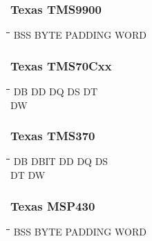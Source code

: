 \subsubsection{Texas TMS9900}
{\tt\begin{tabbing}
\hspace{3cm}\=\hspace{3cm}\=\hspace{3cm}\=\hspace{3cm}\=\kill
BSS        \> BYTE        \> PADDING     \> WORD \\
\end{tabbing}}

\subsubsection{Texas TMS70Cxx}
{\tt\begin{tabbing}
\hspace{3cm}\=\hspace{3cm}\=\hspace{3cm}\=\hspace{3cm}\=\kill
DB         \> DD          \> DQ          \> DS          \> DT \\
DW \\
\end{tabbing}}

\subsubsection{Texas TMS370}
{\tt\begin{tabbing}
\hspace{3cm}\=\hspace{3cm}\=\hspace{3cm}\=\hspace{3cm}\=\kill
DB         \> DBIT        \> DD          \> DQ          \> DS \\
DT         \> DW \\
\end{tabbing}}

\subsubsection{Texas MSP430}
{\tt\begin{tabbing}
\hspace{3cm}\=\hspace{3cm}\=\hspace{3cm}\=\hspace{3cm}\=\kill
BSS        \> BYTE        \> PADDING     \> WORD \\
\end{tabbing}}

